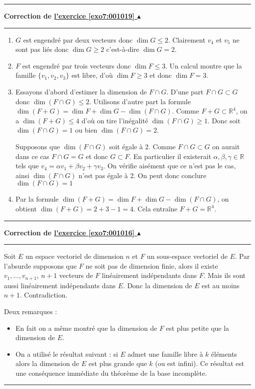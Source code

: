\documentclass[11pt,a4paper]{article}
\newcommand{\Rr}{\mathbb{R}} \newcommand{\R}{\mathbb{R}}
\renewcommand{\ge}{\geqslant} \renewcommand{\geq}{\geqslant}
\newcounter{exo}
\newcommand{\correction}[1]{\hypertarget{cor7:#1}{}\label{cor7:#1}{\bf Correction de \hyperlink{exo7:#1}{l'exercice \ref{exo7:#1} $\blacktriangle$}}\vspace{1mm}\hrule\vspace{1mm}}
\newcommand{\fincorrection}{\vspace{1mm}\hrule\vspace*{7mm}}
\begin{document}
\fincorrection
\correction{001019}
\begin{enumerate}
  \item $G$  est engendr\'e par deux vecteurs donc $\dim G \leq 2$. Clairement  $v_4$ et  $v_5$  ne sont pas li\'es donc
$\dim G \geq 2$  c'est-\`a-dire  $\dim G=2$. 

  \item $F$  est engendr\'e par trois vecteurs donc  $\dim F \leq 3$.
Un calcul montre que la famille $\{ v_1,  v_2, v_3 \} $  est libre, 
d'où $\dim F\geq 3$  et donc $\dim F= 3$.

  \item Essayons d'abord d'estimer la dimension de $F\cap G$. 
D'une part $F\cap G \subset G$  donc  $\dim(F\cap G)\leq 2$.
Utilisons d'autre part la formule $\dim(F+G) =\dim F + \dim G - \dim(F\cap G)$. Comme  $F+G\subset  {\R}^4$, on a
$\dim(F+G)\leq 4$  d'o\`u on tire l'in\'egalit\' e  
$\dim(F\cap G) \ge 1$. Donc soit  $\dim(F\cap G)=1$
ou bien $\dim(F\cap G)=2$.

Supposons que  $\dim(F\cap G)$  soit \'egale \`a $2$. 
Comme  $F\cap G \subset G$  on aurait dans ce cas  $F\cap G =
G$ et donc $G\subset F$.  En particulier il existerait  $\alpha  , \beta , \gamma \in
{\R}$  tels que  $v_4=\alpha v_1 + \beta v_2 + \gamma v_3$. On v\'erifie ais\'ement que ce n'est pas le cas, 
ainsi $\dim (F\cap G)$  n'est pas \'egale \`a  $2$.
On peut donc conclure $\dim(F\cap G)=1$


  \item Par la formule $\dim (F+G) = \dim F + \dim G - \dim (F\cap G)$,
on obtient $\dim (F+G) = 2+3-1=4$. Cela entraîne $F+G=\Rr^4$.
\end{enumerate}
\fincorrection
\correction{001016}
Soit $E$ un espace vectoriel de dimension $n$ et $F$ un sous-espace vectoriel de $E$.
Par l'absurde supposons que $F$ ne soit pas de dimension finie, 
alors il existe $v_1,\ldots,v_{n+1}$, $n+1$ vecteurs de $F$ lin\'eairement ind\'ependants dans $F$.
Mais ils sont aussi lin\'eairement ind\'ependants dans $E$.
Donc la dimension de $E$ est au moins $n+1$. Contradiction.

\bigskip

Deux remarques :
\begin{itemize}
  \item En fait on a m\^eme  montré que la dimension de $F$ est plus petite que la dimension de $E$.
  \item On a utilisé le r\'esultat suivant : si $E$ admet une famille libre \`a $k$ \'el\'ements alors la dimension de $E$ 
est plus grande que $k$ (ou est infini). Ce r\'esultat est une cons\'equence imm\'ediate du th\'eor\`eme de la base incompl\`ete.
\end{itemize}
\fincorrection
\end{document}
